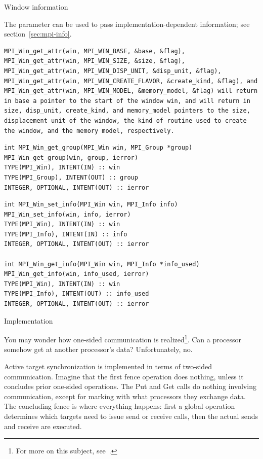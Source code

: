  {Window information}

The  parameter can be used to pass implementation-dependent 
information; see section~\ref{sec:mpi-info}.

\begin{verbatim}
MPI_Win_get_attr(win, MPI_WIN_BASE, &base, &flag), 
MPI_Win_get_attr(win, MPI_WIN_SIZE, &size, &flag), 
MPI_Win_get_attr(win, MPI_WIN_DISP_UNIT, &disp_unit, &flag), 
MPI_Win_get_attr(win, MPI_WIN_CREATE_FLAVOR, &create_kind, &flag), and 
MPI_Win_get_attr(win, MPI_WIN_MODEL, &memory_model, &flag) will return in base a pointer to the start of the window win, and will return in size, disp_unit, create_kind, and memory_model pointers to the size, displacement unit of the window, the kind of routine used to create the window, and the memory model, respectively.
\end{verbatim}

\begin{verbatim}
int MPI_Win_get_group(MPI_Win win, MPI_Group *group) 
MPI_Win_get_group(win, group, ierror) 
TYPE(MPI_Win), INTENT(IN) :: win 
TYPE(MPI_Group), INTENT(OUT) :: group 
INTEGER, OPTIONAL, INTENT(OUT) :: ierror
\end{verbatim}

\begin{verbatim}
int MPI_Win_set_info(MPI_Win win, MPI_Info info)
MPI_Win_set_info(win, info, ierror)
TYPE(MPI_Win), INTENT(IN) :: win
TYPE(MPI_Info), INTENT(IN) :: info
INTEGER, OPTIONAL, INTENT(OUT) :: ierror

int MPI_Win_get_info(MPI_Win win, MPI_Info *info_used)
MPI_Win_get_info(win, info_used, ierror)
TYPE(MPI_Win), INTENT(IN) :: win
TYPE(MPI_Info), INTENT(OUT) :: info_used
INTEGER, OPTIONAL, INTENT(OUT) :: ierror
\end{verbatim}

 {Implementation}

You may wonder how one-sided communication is realized\footnote{For
  more on this subject, see~\cite{thakur:ijhpca-sync}.}. Can a processor
somehow get at another processor's data? Unfortunately, no.

Active target synchronization is implemented in terms of two-sided communication.
Imagine that the first fence operation does nothing, unless it concludes prior
one-sided operations. The Put and Get calls do nothing involving communication,
except for marking with what processors they exchange data.
The concluding fence is where everything happens: first a global operation
determines which targets need to issue send or receive calls, then the
actual sends and receive are executed.

